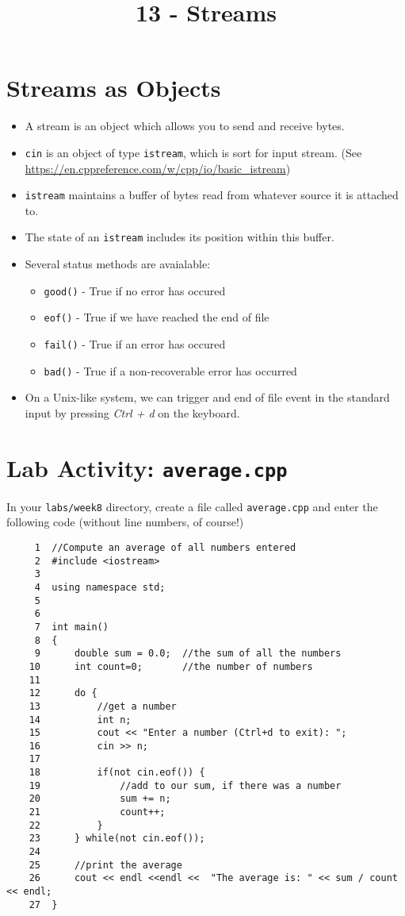 \documentclass[]{article}
\title{13 - Streams}
\date{}
\begin{document}
\maketitle

\section{Streams as Objects}
\begin{itemize}
    \item A stream is an object which allows you to send and receive bytes.
    \item \texttt{cin} is an object of type \texttt{istream}, which is sort for input stream.  (See \url{https://en.cppreference.com/w/cpp/io/basic_istream}) 
    \item \texttt{istream} maintains a buffer of bytes read from whatever source it is attached to.
    \item The state of an \texttt{istream} includes its position within this buffer. 
    \item Several status methods are avaialable:
    \begin{itemize}
        \item \texttt{good()} - True if no error has occured
        \item \texttt{eof()} - True if we have reached the end of file
        \item \texttt{fail()} - True if an error has occured
        \item \texttt{bad()} - True if a non-recoverable error has occurred
    \end{itemize}

    \item On a Unix-like system, we can trigger and end of file event in 
        the standard input by pressing \textit{Ctrl + d} on the keyboard.
\end{itemize}

\pagebreak
\section{Lab Activity: \texttt{average.cpp}}
In your \texttt{labs/week8} directory, create a file called 
\texttt{average.cpp} and enter the following code (without line numbers, of
course!)

\begin{BVerbatim}
     1	//Compute an average of all numbers entered
     2	#include <iostream>
     3	
     4	using namespace std;
     5	
     6	
     7	int main()
     8	{
     9	    double sum = 0.0;  //the sum of all the numbers
    10	    int count=0;       //the number of numbers
    11	
    12	    do {
    13	        //get a number
    14	        int n;
    15	        cout << "Enter a number (Ctrl+d to exit): ";
    16	        cin >> n;
    17	    
    18	        if(not cin.eof()) {
    19	            //add to our sum, if there was a number
    20	            sum += n;
    21	            count++;
    22	        }
    23	    } while(not cin.eof());
    24	
    25	    //print the average
    26	    cout << endl <<endl <<  "The average is: " << sum / count << endl;
    27	}
\end{BVerbatim}
\end{document}
